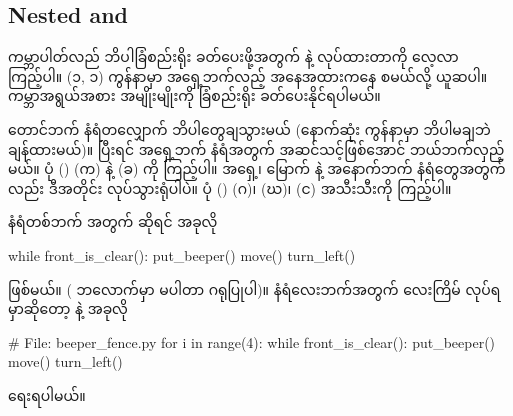 \subsection*{Nested  and }
ကမ္ဘာပါတ်လည် ဘိပါခြံစည်းရိုး ခတ်ပေးဖို့အတွက်  နဲ့   လုပ်ထားတာကို လေ့လာကြည့်ပါ။ (၁, ၁) ကွန်နာမှာ အရှေ့ဘက်လည့် အနေအထားကနေ စမယ်လို့ ယူဆပါ။ ကမ္ဘာအရွယ်အစား အမျိုးမျိုးကို ခြံစည်းရိုး ခတ်ပေးနိုင်ရပါမယ်။

တောင်ဘက် နံရံတလျှောက် ဘိပါတွေချသွားမယ် (နောက်ဆုံး ကွန်နာမှာ ဘိပါမချဘဲ ချန်ထားမယ်)။ ပြီးရင် အရှေ့ဘက် နံရံအတွက် အဆင်သင့်ဖြစ်အောင် ဘယ်ဘက်လှည့်မယ်။ ပုံ (\fRefNo{\ref{fig:beeper_fence_iters}}) (က) နဲ့ (ခ) ကို ကြည့်ပါ။ အရှေ့၊ မြောက် နဲ့ အနောက်ဘက် နံရံတွေအတွက်လည်း ဒီအတိုင်း လုပ်သွားရုံပါပဲ။ ပုံ (\fRefNo{\ref{fig:beeper_fence_iters}}) (ဂ)၊ (ဃ)၊ (င) အသီးသီးကို ကြည့်ပါ။

နံရံတစ်ဘက် အတွက် ဆိုရင် အခုလို
%
\begin{py}
while front_is_clear():
    put_beeper()
    move()
turn_left()
\end{py}
%
ဖြစ်မယ်။ ( ဘလောက်မှာ   မပါတာ ဂရုပြုပါ)။ နံရံလေးဘက်အတွက် လေးကြိမ် လုပ်ရမှာဆိုတော့  နဲ့ အခုလို
%
\begin{py}
# File: beeper_fence.py
for i in range(4):
    while front_is_clear():
        put_beeper()
        move()
    turn_left()
\end{py}
%
ရေးရပါမယ်။

